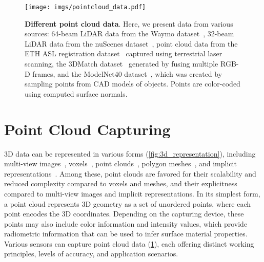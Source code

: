 \begin{figure}[t]
    \centering
    \texttt{[image: imgs/pointcloud\_data.pdf]}
    \caption{\textbf{Different point cloud data}. Here, we present data from various sources: 64-beam LiDAR data from the Waymo dataset~\cite{sun2020scalability}, 32-beam LiDAR data from the nuScenes dataset~\cite{caesar2020nuscenes}, point cloud data from the ETH ASL registration dataset~\cite{Pomerleau_2012} captured using terrestrial laser scanning, the 3DMatch dataset~\cite{zeng20163dmatch} generated by fusing multiple RGB-D frames, and the ModelNet40 dataset~\cite{wu2015ModelNet}, which was created by sampling points from CAD models of objects. Points are color-coded using computed surface normals.}
    \label{fig:bg_pointcloud}
\end{figure}


\section{Point Cloud Capturing}
\label{sec:bg_pc_caputure}
3D data can be represented in various forms (\cf \cref{fig:3d_representation}), including multi-view images~\cite{su2015multi,qi2016volumetric}, voxels~\cite{wu20153d,maturana2015voxnet}, point clouds~\cite{qi2017pointnet,wang2019dynamic}, polygon meshes~\cite{hanocka2019meshcnn,NEURIPS2020_0a656cc1}, and implicit representations~\cite{mescheder2019occupancy,park2019deepsdf,chen2019learning,yang2021geometry}. Among these, point clouds are favored for their scalability and reduced complexity compared to voxels and meshes, and their explicitness compared to multi-view images and implicit representations. In its simplest form, a point cloud represents 3D geometry as a set of unordered points, where each point encodes the 3D coordinates. Depending on the capturing device, these points may also include color information and intensity values, which provide radiometric information that can be used to infer surface material properties. Various sensors can capture point cloud data (\cf \cref{fig:bg_pointcloud}), each offering distinct working principles, levels of accuracy, and application scenarios.

